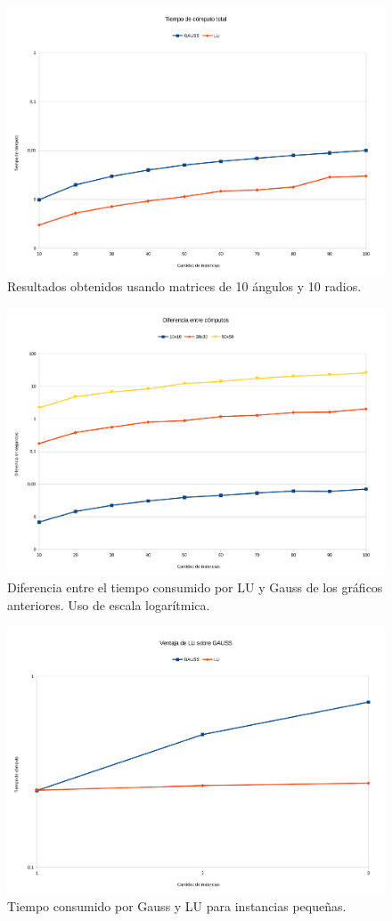 \begin{figure}[H]{}
\centering
\includegraphics[scale=0.5]{graphs/gaussVsLU3.pdf}
\caption{Resultados obtenidos usando matrices de 10 ángulos y 10 radios.}
\label{gaussVsLU3}
\end{figure}

\begin{figure}[H]{}
\centering
\includegraphics[scale=0.5]{graphs/dif.pdf}
\caption{Diferencia entre el tiempo consumido por LU y Gauss de los gráficos anteriores. Uso de escala logarítmica.}
\label{gaussVsLU4}
\end{figure}


\begin{figure}[H]{}
\centering
\includegraphics[scale=0.5]{graphs/ventRA.pdf}
\caption{Tiempo consumido por Gauss y LU para instancias pequeñas.}
\label{gaussVsLU5}
\end{figure}
